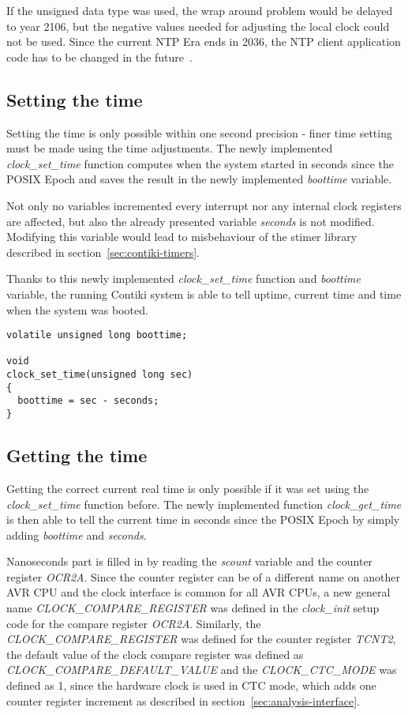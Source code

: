 If the unsigned data type was used, the wrap around problem would be delayed to year 2106,
but the negative values needed for adjusting the local clock could not be used.
Since the current NTP Era ends in 2036,
the NTP client application code has to be changed in the future~\cite{ntp-y2k}.

\subsection{Setting the time}
Setting the time is only possible within one second precision -
finer time setting must be made using the time adjustments.
The newly implemented {\it{clock\_set\_time}} function computes when the system started
in seconds since the POSIX Epoch and saves the result in the newly implemented {\it{boottime}} variable.

Not only no variables incremented every interrupt nor any internal clock registers
are affected, but also the already presented variable {\it{seconds}} is not modified.
Modifying this variable would lead to misbehaviour of the stimer library
described in section~\ref{sec:contiki-timers}.

Thanks to this newly implemented {\it{clock\_set\_time}} function and {\it{boottime}} variable,
the running Contiki system is able to tell uptime, current time and time when the system was booted.
\begin{lstlisting}
volatile unsigned long boottime;

void
clock_set_time(unsigned long sec)
{
  boottime = sec - seconds;
}
\end{lstlisting}


\subsection{Getting the time}
Getting the correct current real time is only possible if it was set using
the {\it{clock\_set\_time}} function before.
The newly implemented function {\it{clock\_get\_time}} is then able to tell the
current time in seconds since the POSIX Epoch by simply adding {\it{boottime}}
and {\it{seconds}}.

Nanoseconds part is filled in by reading the {\it{scount}} variable and the counter register {\it{OCR2A}}.
Since the counter register can be of a different name on another AVR CPU
and the clock interface is common for all AVR CPUs,
a new general name {\it{CLOCK\_COMPARE\_REGISTER}} was defined in the {\it{clock\_init}} setup code
for the compare register {\it{OCR2A}}.
Similarly, the {\it{CLOCK\_COMPARE\_REGISTER}} was defined for the counter register {\it{TCNT2}},
the default value of the clock compare register was defined as {\it{CLOCK\_COMPARE\_DEFAULT\_VALUE}}
and the {\it{CLOCK\_CTC\_MODE}} was defined as 1, since the hardware clock is used in CTC mode,
which adds one counter register increment as described in section~\ref{sec:analysis-interface}.

